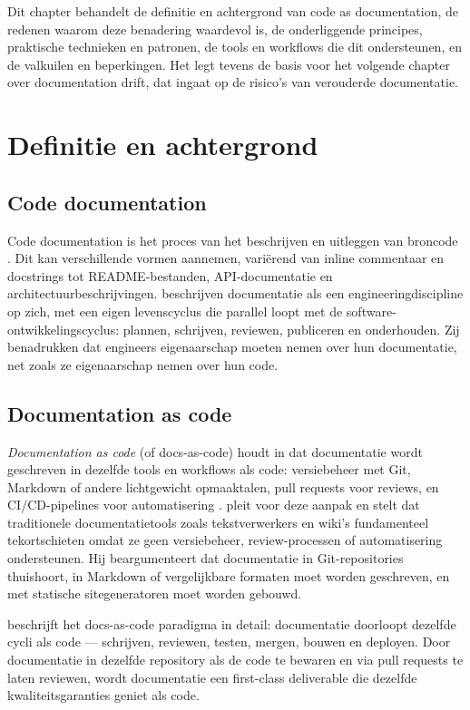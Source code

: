 Dit chapter behandelt de definitie en achtergrond van code as documentation, de redenen waarom deze benadering waardevol is, de onderliggende principes, praktische technieken en patronen, de tools en workflows die dit ondersteunen, en de valkuilen en beperkingen. Het legt tevens de basis voor het volgende chapter over documentation drift, dat ingaat op de risico's van verouderde documentatie.

\section{Definitie en achtergrond}
\label{sec:cad-definitie}

\subsection{Code documentation}
Code documentation is het proces van het beschrijven en uitleggen van broncode \autocite{bhatti2021docsdevelopers}. Dit kan verschillende vormen aannemen, variërend van inline commentaar en docstrings tot README-bestanden, API-documentatie en architectuurbeschrijvingen. \textcite{bhatti2021docsdevelopers} beschrijven documentatie als een engineeringdiscipline op zich, met een eigen levenscyclus die parallel loopt met de software-ontwikkelingscyclus: plannen, schrijven, reviewen, publiceren en onderhouden. Zij benadrukken dat engineers eigenaarschap moeten nemen over hun documentatie, net zoals ze eigenaarschap nemen over hun code.

\subsection{Documentation as code}
\textit{Documentation as code} (of docs-as-code) houdt in dat documentatie wordt geschreven in dezelfde tools en workflows als code: versiebeheer met Git, Markdown of andere lichtgewicht opmaaktalen, pull requests voor reviews, en CI/CD-pipelines voor automatisering \autocite{gentle2017docslikecode}. \textcite{etter2016moderntechwriting} pleit voor deze aanpak en stelt dat traditionele documentatietools zoals tekstverwerkers en wiki's fundamenteel tekortschieten omdat ze geen versiebeheer, review-processen of automatisering ondersteunen. Hij beargumenteert dat documentatie in Git-repositories thuishoort, in Markdown of vergelijkbare formaten moet worden geschreven, en met statische sitegeneratoren moet worden gebouwd.

\textcite{gentle2017docslikecode} beschrijft het docs-as-code paradigma in detail: documentatie doorloopt dezelfde cycli als code --- schrijven, reviewen, testen, mergen, bouwen en deployen. Door documentatie in dezelfde repository als de code te bewaren en via pull requests te laten reviewen, wordt documentatie een first-class deliverable die dezelfde kwaliteitsgaranties geniet als code.

